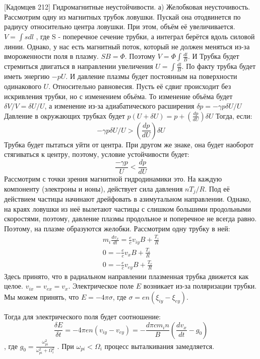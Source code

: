 \documentclass[10pt, a4paper]{article}
\begin{document}
[Кадомцев 212]
Гидромагнитные неустойчивости.
а) Желобковая неусточивость.
Рассмотрим одну из магнитных трубок ловушки. Пускай она отодвинется по радиусу относительно центра ловушки. При этом, объём её увеличивается. $V=\int s dl$ , где S - поперечное сечение трубки, а интеграл берётся вдоль силовой линии. Однако, у нас есть магнитный поток, который не должен меняться из-за вмороженности поля в плазму. $SB=\Phi$. Поэтому $V=\Phi \int \frac{dl}{B}$. И Трубка будет стремиться двигаться в направлении увеличения $U=\int \frac{dl}{B}$. По факту трубка будет иметь энергию $-pU$. И давление плазмы будет постоянным на поверхности одинакового $U$.
Относительно равновесия. Пусть её сдвиг происходит без искривления трубки, но с изменением объёма. То изменение объёма будет $\delta V/V= \delta U/U$, а изменение из-за адиабатического расширения $\delta p = -\gamma p \delta U/U$ 
Давление в окружающих трубках будет $p(U+\delta U)=p+(\frac{dp}{dU}) \delta U$
Тогда, если:
\begin{equation}
	-\gamma p \delta U/U > (\frac{dp}{dU}) \delta U
\end{equation}
Трубка будет пытаться уйти от центра. При другом же знаке, она будет наоборот стягиваться к центру, поэтому, условие устойчивости будет:
\begin{equation}
	\frac{ -\gamma p}{U} < \frac{dp}{dU}
\end{equation}
Рассмотрим с точки зрения магнитной гидродинамики это. На каждую компоненту (электроны и ионы), действует сила давления $nT_j /R$. Под её действием частицы начинают дрейфовать в азимутальном направлении.
Однако, на краях ловушки из неё вылетают частицы с слишком большими продольными скоростями, поэтому, давление плазмы продольное и поперечное не всегда равно. Поэтому, на плазме образуются желобки. Рассмотрим одну трубку в ней:
\begin{align*}
	m_i \frac{d v_x}{dt}= \frac{e}{c} v_{iy} B + \frac{T_i}{R}\\
	0= -\frac{e}{c} v_{x} B + \frac{T_i}{R}\\
	0= -\frac{e}{c} v_{ey} B + \frac{T_e}{R}
\end{align*}
Здесь принято, что в радиальном направлении плазменная трубка движется как целое. $v_{ix}=v_{ex}=v_x$. Электрическое поле $E$ возникает из-за поляризации трубки. Мы можем принять, что $E=- 4 \pi \sigma$, где $\sigma=en(\xi_{iy} - \xi_{ey})$. 

Тогда для электрического поля будет соотношение:
\begin{equation}
	\frac{\delta E}{\delta t} = -4 \pi e n (v_{iy}-v_{ey})=- \frac{d \pi c m_i n}{B} (\frac{d v_x}{dt} - g_0)
\end{equation}
, где $g_0=\frac{\omega^2_{pi}}{\omega^2_{pi}+\Omega^2_i}$ . При $\omega_{pi} <\Omega_{i}$ процесс выталкивания замедляется.
\end{document}
